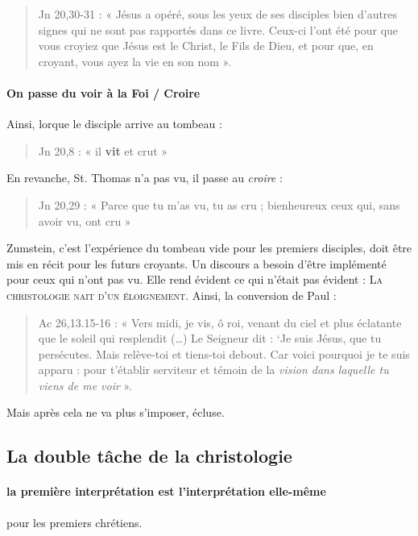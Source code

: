   \begin{quote}
      Jn  20,30-31  :  «  Jésus  a  opéré,  sous  les  yeux  de  ses  disciples  bien  d’autres  signes  qui  ne  sont pas  rapportés  dans  ce  livre.  Ceux-ci  l’ont  été  pour  que  vous  croyiez  que  Jésus  est  le  Christ,  le Fils  de  Dieu, et  pour que, en croyant, vous  ayez  la  vie  en son nom  ». 
  \end{quote}
    
    
    \paragraph{On passe du voir à la Foi / Croire}
    Ainsi, lorque le disciple arrive au tombeau : 
    \begin{quote}
        Jn 20,8  :  «  il  \textbf{vit}  et  crut  »   
    \end{quote}
    En revanche, St. Thomas n'a pas vu, il passe au \textit{croire} : 
    \begin{quote}
            Jn 20,29  :  «  Parce  que  tu m’as  vu, tu as  cru  ;  bienheureux ceux qui, sans  avoir vu, ont  cru  »   
    \end{quote}
    Zumstein, c'est l'expérience du tombeau vide pour les premiers disciples, doit être mis en récit pour les futurs croyants. Un discours a besoin d'être implémenté pour ceux qui n'ont pas vu. Elle rend évident ce qui n'était pas évident : \textsc{La christologie nait d'un éloignement}. Ainsi, la conversion de Paul : 
   \begin{quote}
       Ac  26,13.15-16  :  «  Vers  midi,  je  vis,  ô  roi,  venant  du  ciel  et  plus  éclatante  que  le  soleil  qui resplendit  (…)  Le  Seigneur  dit  :  ‘Je  suis  Jésus,  que  tu  persécutes.  Mais  relève-toi  et  tiens-toi debout.  Car  voici  pourquoi  je  te  suis  apparu  :  pour  t’établir  serviteur  et  témoin  de  la  \emph{vision dans  laquelle  tu viens  de  me  voir}  ». 
   \end{quote}
    Mais après cela ne va plus s'imposer, écluse.
    
    
\subsection{La double tâche de la christologie}

\paragraph{la première interprétation est l'interprétation elle-même} pour les premiers chrétiens. 

